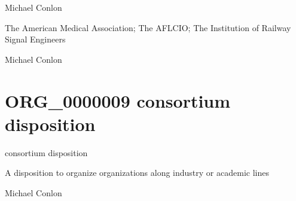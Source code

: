 \documentclass[letterpaper,10pt,english]{sphinxmanual}
\begin{document}
\begin{sphinxShadowBox}

\sphinxAtStartPar
Michael Conlon 
\end{sphinxShadowBox}

\begin{sphinxShadowBox}

\sphinxAtStartPar
The American Medical Association; The AFL\sphinxhyphen{}CIO; The Institution of Railway Signal Engineers
\end{sphinxShadowBox}

\begin{sphinxShadowBox}

\sphinxAtStartPar
Michael Conlon 
\end{sphinxShadowBox}
\begin{quote}
\label{\detokenize{doc-ORG_0000009:org-0000009}}\label{\detokenize{doc-ORG_0000009:consortium-disposition}}\label{\detokenize{doc-ORG_0000009:org-0000009}}
\ignorespaces \end{quote}


\section{ORG\_0000009 \sphinxhyphen{} consortium disposition}
\label{\detokenize{doc-ORG_0000009:org-0000009-consortium-disposition}}\label{\detokenize{doc-ORG_0000009:index-0}}\label{\detokenize{doc-ORG_0000009::doc}}
\begin{sphinxShadowBox}

\sphinxAtStartPar
consortium disposition
\end{sphinxShadowBox}

\begin{sphinxShadowBox}

\sphinxAtStartPar
A disposition to organize organizations along industry or academic lines
\end{sphinxShadowBox}

\begin{sphinxShadowBox}

\sphinxAtStartPar
Michael Conlon 
\end{sphinxShadowBox}
\end{document}

